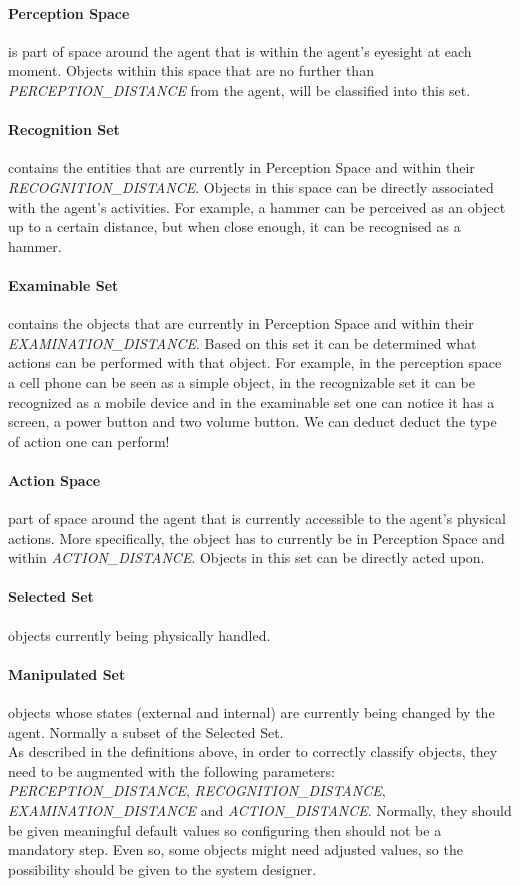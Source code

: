 \paragraph{Perception Space} is part of space around the agent that is within the agent's eyesight at each moment. Objects within this space that are no further than \emph{PERCEPTION\_DISTANCE} from the agent, will be classified into this set.
\paragraph{Recognition Set} contains the entities that are currently in Perception Space and within their \emph{RECOGNITION\_DISTANCE}. Objects in this space can be directly associated with the agent's activities. For example, a hammer can be perceived as an object up to a certain distance, but when close enough, it can be recognised as a hammer.
\paragraph{Examinable Set} contains the objects that are currently in Perception Space and within their \emph{EXAMINATION\_DISTANCE}. Based on this set it can be determined what actions can be performed with that object. For example, in the perception space a cell phone can be seen as a simple object, in the recognizable set it can be recognized as a mobile device and in the examinable set one can notice it has a screen, a power button and two volume button. We can deduct deduct the type of action one can perform!
\paragraph{Action Space} part of space around the agent that is currently accessible to the agent's physical actions. More specifically, the object has to currently be in Perception Space and within \emph{ACTION\_DISTANCE}. Objects in this set can be directly acted upon.
\paragraph{Selected Set} objects currently being physically handled.
\paragraph{Manipulated Set} objects whose states (external and internal) are currently being changed by the agent. Normally a subset of the Selected Set.\\

As described in the definitions above, in order to correctly classify objects, they need to be augmented with the following parameters: \emph{PERCEPTION\_DISTANCE}, \emph{RECOGNITION\_DISTANCE}, \emph{EXAMINATION\_DISTANCE} and \emph{ACTION\_DISTANCE}. Normally, they should be given meaningful default values so configuring then should not be a mandatory step. Even so, some objects might need adjusted values, so the possibility should be given to the system designer.
